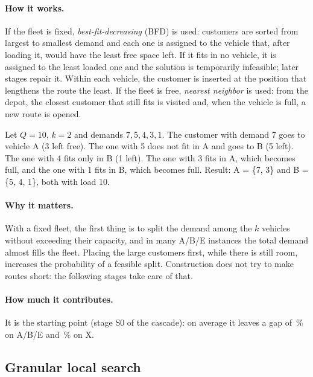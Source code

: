 \documentclass[11pt,a4paper]{article}
\begin{document}
\paragraph{How it works.} If the fleet is fixed, \emph{best-fit-decreasing} (BFD) is used: customers
are sorted from largest to smallest demand and each one is assigned to the vehicle that, after
loading it, would have the least free space left. If it fits in no vehicle, it is assigned to the
least loaded one and the solution is temporarily infeasible; later stages repair it. Within each
vehicle, the customer is inserted at the position that lengthens the route the least. If the fleet
is free, \emph{nearest neighbor} is used: from the depot, the closest customer that still fits is
visited and, when the vehicle is full, a new route is opened.

\begin{ejemplo}
Let $Q=10$, $k=2$ and demands $7,5,4,3,1$. The customer with demand 7 goes to vehicle A (3 left
free). The one with 5 does not fit in A and goes to B (5 left). The one with 4 fits only in B (1
left). The one with 3 fits in A, which becomes full, and the one with 1 fits in B, which becomes
full. Result: A = \{7, 3\} and B = \{5, 4, 1\}, both with load 10.
\end{ejemplo}

\paragraph{Why it matters.} With a fixed fleet, the first thing is to split the demand among the $k$
vehicles without exceeding their capacity, and in many A/B/E instances the total demand almost fills
the fleet. Placing the large customers first, while there is still room, increases the probability
of a feasible split. Construction does not try to make routes short: the following stages take care
of that.

\paragraph{How much it contributes.} It is the starting point (stage S0 of the cascade): on average it
leaves a gap of \cgABEa\,\% on A/B/E and \cgXa\,\% on X.

\subsection{Granular local search}
\label{sec:granular}
\end{document}
